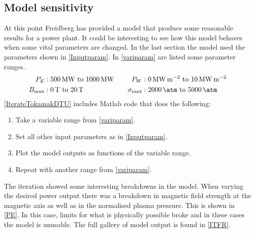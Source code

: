 \subsection{Model sensitivity}
At this point Freidberg has provided a model that produce some reasonable results for a power plant. It could be interesting to see how this model behaves when some vital parameters are changed. In the last section the model used the parameters shown in \cref{Inputparam}. In \cref{variparam} are listed some parameter ranges.
\begin{alignat}{3}
	P_E &: \SIrange{500}{1000}{\mega\watt} & \quad P_W &: \SIrange{0}{10}{\mega\watt\per\meter\squared}\nonumber\\
	B_{\max} &: \SIrange{0}{20}{\tesla} & \quad \sigma_{\max} &: \SIrange{2000}{5000}{\atm}\label{variparam}
\end{alignat}
\cref{IterateTokamakDTU} includes Matlab code that does the following:
\begin{enumerate}
	\item Take a variable range from \cref{variparam}.
	\item Set all other input parameters as in \cref{Inputparam}.
	\item Plot the model outputs as functions of the variable range.
	\item Repeat with another range from \cref{variparam}.
\end{enumerate}
The iteration showed some interesting breakdowns in the model. When varying the desired power output there was a breakdown in magnetic field strength at the magnetic axis as well as in the normalised plasma pressure. This is shown in \cref{PE}.
In this case, limits for what is physically possible broke and in these cases the model is unusable.
The full gallery of model output is found in \cref{ITFR}.
